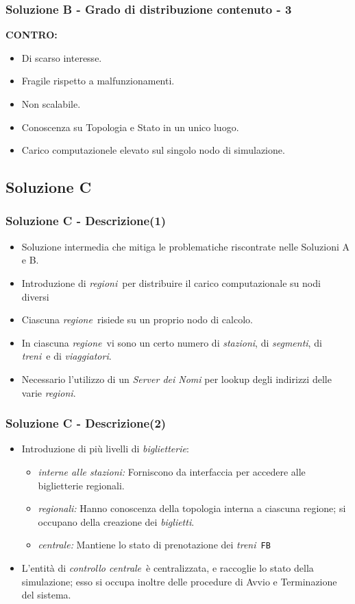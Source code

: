 \documentclass[slidestop,compress,blackandwhite]{beamer}
\newcommand{\ttt}[1]{\texttt{#1}}
\newcommand{\ii}[1]{\textit{#1}}
\newcommand{\treni}{\ii{treni}}
\newcommand{\viaggiatori}{\ii{viaggiatori}}
\newcommand{\stazioni}{\ii{stazioni}}
\newcommand{\tickets}{\ii{biglietti}}
\newcommand{\segmenti}{\ii{segmenti}}
\newcommand{\biglietterie}{\ii{biglietterie}}
\newcommand{\controller}{\ii{controllo centrale}}
\newcommand{\regione}{\ii{regione}}
\newcommand{\regioni}{\ii{regioni}}
\newcommand{\CONTRO}{\textbf{CONTRO:}}
\newcommand{\newframe}[2]{\begin{frame}\frametitle{#1}#2\end{frame}}
\newcommand{\myitemize}[1]{\begin{itemize}#1\end{itemize}}
\begin{document}
	
	\newframe{Soluzione B - Grado di distribuzione contenuto - 3}{
		\vspace{0.5cm}
		\CONTRO
			\begin{itemize}
				\item Di scarso interesse.
				\item Fragile rispetto a malfunzionamenti.
				\item Non scalabile.
				\item Conoscenza su Topologia e Stato in un unico luogo.
				\item Carico computazionele elevato sul singolo nodo di simulazione.
			\end{itemize}
	}
	
	\subsection{Soluzione C}
	
	\newframe{Soluzione C - Descrizione(1)}{
		\vspace{0.5cm}
		\begin{itemize}
			\item Soluzione intermedia che mitiga le problematiche riscontrate nelle Soluzioni A e B.
			\item Introduzione di \regioni~per distribuire il carico computazionale su nodi diversi
			\item Ciascuna \regione~risiede su un proprio nodo di calcolo.
			\item In ciascuna \regione~vi sono un certo numero di \stazioni, di \segmenti, di \treni~e di \viaggiatori.
			\item Necessario l'utilizzo di un \ii{Server dei Nomi} per lookup degli indirizzi delle varie \regioni.
		\end{itemize}
	
	}
	
	\newframe{Soluzione C - Descrizione(2)}{
		\vspace{0.5cm}
		\myitemize{
			\item Introduzione di più livelli di \biglietterie:
				\myitemize{
					\item \ii{interne alle stazioni:} Forniscono da interfaccia per accedere alle biglietterie regionali.
					\item \ii{regionali:} Hanno conoscenza della topologia interna a ciascuna regione; si occupano della creazione dei \tickets.
					\item \ii{centrale:} Mantiene lo stato di prenotazione dei \treni~\ttt{FB}
				}
			\item L'entità di \controller~è centralizzata, e raccoglie lo stato della simulazione; esso si occupa inoltre delle procedure di Avvio e Terminazione del sistema.
		}
	}
	
\end{document}
